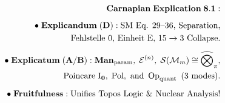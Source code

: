\documentclass[preview]{standalone}
\begin{document}
\begin{align*}
\special{dvisvgm:raw <g id='unique000'>}\mathbf{Carnapian\;Explication\;8.1:}\\[5pt]\bullet\;\mathbf{Explicandum\;(D):}\;\text{SM Eq. 29--36, Separation,}\\\;\;\text{Fehlstelle 0, Einheit E, }15\to 3\text{ Collapse.}\\[5pt]\bullet\;\mathbf{Explicatum\;(A/B):}\;\mathbf{Man}_{\text{param}},\;\mathcal{E}^{(n)},\;\mathcal{S}(\mathcal{M}_m)\cong\widehat{\bigotimes}_\pi,\\\;\;\text{Poincare }\mathrm{I}_{\mathbf{0}},\;\operatorname{Pol},\text{ and }\operatorname{Op}_{\text{quant}}\text{ (3 modes).}\\[5pt]\bullet\;\mathbf{Fruitfulness:}\;\text{Unifies Topos Logic \& Nuclear Analysis!}\special{dvisvgm:raw </g>}
\end{align*}
\end{document}
